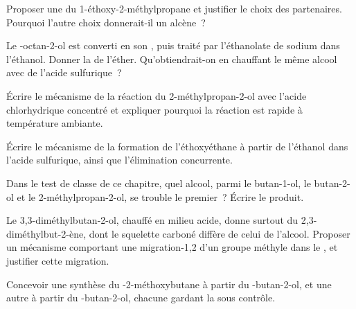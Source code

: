 \begin{exercise}[$\star\star$]\label{exo:b1:alcohol-activation:5}
Proposer une  du 1-éthoxy-2-méthylpropane et
justifier le choix des partenaires. Pourquoi l'autre choix donnerait-il
un alcène~?
\end{exercise}

\begin{exercise}[$\star\star$]\label{exo:b1:alcohol-activation:6}
Le -octan-2-ol est converti en son , puis traité par
l'éthanolate de sodium dans l'éthanol. Donner la  de
l'éther. Qu'obtiendrait-on en chauffant le même alcool avec de l'acide
sulfurique~?
\end{exercise}

\begin{exercise}[$\star\star$]\label{exo:b1:alcohol-activation:7}
Écrire le mécanisme de la réaction du 2-méthylpropan-2-ol avec l'acide
chlorhydrique concentré et expliquer pourquoi la réaction est rapide à
température ambiante.
\end{exercise}

\begin{exercise}[$\star\star$]\label{exo:b1:alcohol-activation:8}
Écrire le mécanisme de la formation de l'éthoxyéthane à partir de
l'éthanol dans l'acide sulfurique, ainsi que l'élimination concurrente.
\end{exercise}

\begin{exercise}[$\star\star$]\label{exo:b1:alcohol-activation:9}
Dans le test de classe de ce chapitre, quel alcool, parmi le
butan-1-ol, le butan-2-ol et le 2-méthylpropan-2-ol, se trouble le
premier~? Écrire le produit.
\end{exercise}

\begin{exercise}[$\star\star\star$]\label{exo:b1:alcohol-activation:10}
Le 3,3-diméthylbutan-2-ol, chauffé en milieu acide, donne surtout du
2,3-diméthylbut-2-ène, dont le squelette carboné diffère de celui de
l'alcool. Proposer un mécanisme comportant une migration-1,2 d'un groupe
méthyle dans le , et justifier cette migration.
\end{exercise}

\begin{exercise}[$\star\star\star$]\label{exo:b1:alcohol-activation:11}
Concevoir une synthèse du -2-méthoxybutane à partir du
-butan-2-ol, et une autre à partir du -butan-2-ol, chacune
gardant la  sous contrôle.
\end{exercise}


